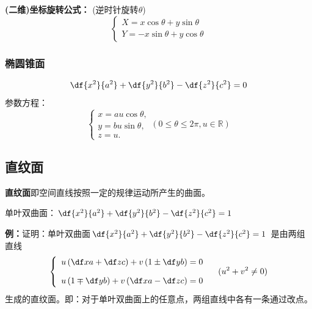 {\bf (二维)坐标旋转公式：}{ (逆时针旋转$\theta$)}
$${\left\{\begin{array}{l}
	X=x\cos\theta+y\sin\theta\\
	Y=-x\sin\theta+y\cos\theta
\end{array}\right.}$$

\subsubsection{椭圆锥面}
$${\df{x^2}{a^2}+\df{y^2}{b^2}-\df{z^2}{c^2}=0}$$
参数方程：
$$\left\{\begin{array}{l}
	x=au\cos\theta,\\
	y=bu\sin\theta,\\
	z=u.
\end{array}\right.(0\leq\theta\leq 2\pi,u\in\mathbb{R})$$

\subsection{直纹面}

{\bf 直纹面}即空间直线按照一定的规律运动所产生的曲面。
\begin{center}
	
	单叶双曲面：$\df{x^2}{a^2}+\df{y^2}{b^2}-\df{z^2}{c^2}=1$
\end{center}

{\bf 例：}证明：单叶双曲面$\df{x^2}{a^2}+\df{y^2}{b^2}-\df{z^2}{c^2}=1$
是由两组直线
$$\left\{\begin{array}{l}
	u\left(\df xa+\df zc\right)+v\left(1\pm\df yb\right)=0\\[1em]
	u\left(1\mp\df yb\right)+v\left(\df xa-\df zc\right)=0
\end{array}\right.\quad (u^2+v^2\ne 0)$$
生成的直纹面。即：对于单叶双曲面上的任意点，两组直线中各有一条通过改点。

